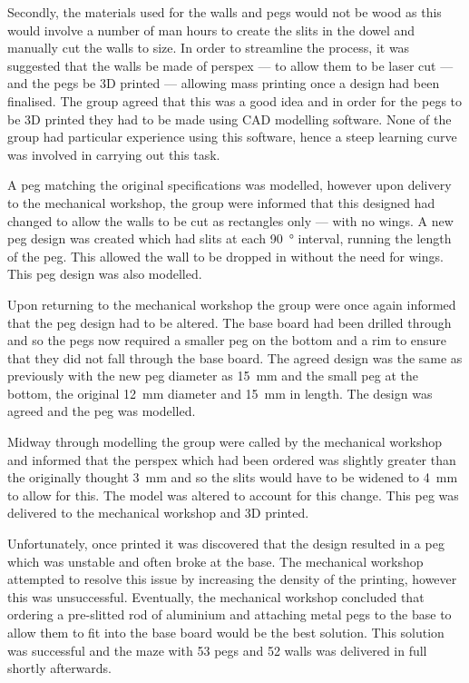 Secondly, the materials used for the walls and pegs would not be wood as this 
would involve a number of man hours to create the slits in the dowel and 
manually cut the walls to size. In order to streamline the process, it was 
suggested that the walls be made of perspex --- to allow 
them to be laser cut --- and the pegs be 3D printed --- allowing mass printing 
once a design had been finalised. The group agreed that this was a good idea and 
in order for the pegs to be 3D printed they had to be made using CAD modelling 
software. None of the group had particular experience using this software, hence 
a steep learning curve was involved in carrying out this task. 

A peg matching the original specifications was modelled, however upon delivery 
to the mechanical workshop, the group were informed that this designed had 
changed to allow the walls to be cut as rectangles only --- with no wings. A new 
peg design was created which had slits at each \SI{90}{\degree} interval, 
running the length of the peg. This allowed the wall to be dropped in without 
the need for wings. This peg design was also modelled. 

Upon returning to the mechanical workshop the group were once again informed 
that the peg design had to be altered. The base board had been drilled through 
and so the pegs now required a smaller peg on the bottom and a rim to ensure 
that they did not fall through the base board. The agreed design was the same as 
previously with the new peg diameter as \SI{15}{\mm} and the small peg at the 
bottom, the original \SI{12}{\mm} diameter and \SI{15}{\mm} in length. The 
design was agreed and the peg was modelled. 

Midway through modelling the group were called by the mechanical workshop and 
informed that the perspex which had been ordered was slightly greater than the 
originally thought \SI{3}{\mm} and so the slits would have to be widened to 
\SI{4}{\mm} to allow for this. The model was altered to account for this change. 
This peg was delivered to the mechanical workshop and 3D printed. 

Unfortunately, once printed it was discovered that the design resulted in a peg 
which was unstable and often broke at the base. The mechanical workshop 
attempted to resolve this issue by increasing the density of the printing, 
however this was unsuccessful. Eventually, the mechanical workshop concluded 
that ordering a pre-slitted rod of aluminium and attaching metal pegs to the 
base to allow them to fit into the base board would be the best solution. This 
solution was successful and the maze with 53 pegs and 52 walls was
delivered in full shortly afterwards. 

